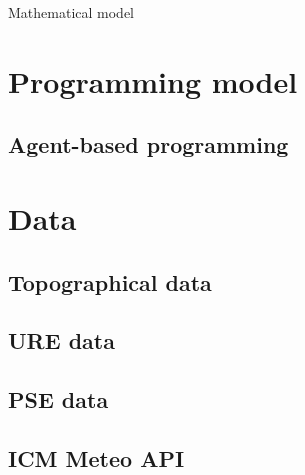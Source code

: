 Mathematical model \cite{mod-agentowe}

\section{Programming model}

\subsection{Agent-based programming}


\section{Data}

\subsection{Topographical data}

\subsection{URE data}

\subsection{PSE data}

\subsection{ICM Meteo API}

